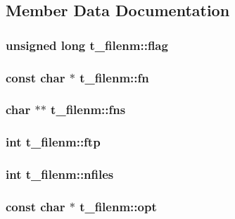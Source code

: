 \subsection{\-Member \-Data \-Documentation}
\hypertarget{structt__filenm_a5229ed45472d5edf342bff402715f286}{
\subsubsection[{flag}]{\setlength{\rightskip}{0pt plus 5cm}unsigned long {\bf t\-\_\-filenm\-::flag}}}\label{structt__filenm_a5229ed45472d5edf342bff402715f286}
\hypertarget{structt__filenm_a5d0b3a73afb65aca0a48c4bf03dcfc7f}{
\subsubsection[{fn}]{\setlength{\rightskip}{0pt plus 5cm}const char $\ast$ {\bf t\-\_\-filenm\-::fn}}}\label{structt__filenm_a5d0b3a73afb65aca0a48c4bf03dcfc7f}
\hypertarget{structt__filenm_ac5e7a7514798eb08ecba4a4bae53c176}{
\subsubsection[{fns}]{\setlength{\rightskip}{0pt plus 5cm}char $\ast$$\ast$ {\bf t\-\_\-filenm\-::fns}}}\label{structt__filenm_ac5e7a7514798eb08ecba4a4bae53c176}
\hypertarget{structt__filenm_acf045291fceda287a4e9fe4758812195}{
\subsubsection[{ftp}]{\setlength{\rightskip}{0pt plus 5cm}int {\bf t\-\_\-filenm\-::ftp}}}\label{structt__filenm_acf045291fceda287a4e9fe4758812195}
\hypertarget{structt__filenm_ace26dce9bca926099a7744c43a3d7914}{
\subsubsection[{nfiles}]{\setlength{\rightskip}{0pt plus 5cm}int {\bf t\-\_\-filenm\-::nfiles}}}\label{structt__filenm_ace26dce9bca926099a7744c43a3d7914}
\hypertarget{structt__filenm_a6331c1b994de210d677c1d8e986d6f2b}{
\subsubsection[{opt}]{\setlength{\rightskip}{0pt plus 5cm}const char $\ast$ {\bf t\-\_\-filenm\-::opt}}}\label{structt__filenm_a6331c1b994de210d677c1d8e986d6f2b}


